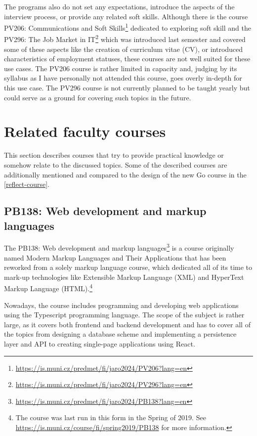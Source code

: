 \documentclass[
  digital,
  color,
  oneside,
  nosansbold,
  nocolorbold,
  nolof,
  nolot,
]{fithesis4}
\begin{document}
The programs also do not set any expectations, introduce the aspects of the interview process, or provide any related soft skills. Although there is the course PV206: Communications and Soft Skills\footnote{\url{https://is.muni.cz/predmet/fi/jaro2024/PV206?lang=en}} dedicated to exploring soft skill and the PV296: The Job Market in IT\footnote{\url{https://is.muni.cz/predmet/fi/jaro2024/PV296?lang=en}} which was introduced last semester and covered some of these aspects like the creation of curriculum vitae (CV), or introduced characteristics of employment statuses, these courses are not well suited for these use cases. The PV206 course is rather limited in capacity and, judging by its syllabus as I have personally not attended this course, goes overly in-depth for this use case. The PV296 course is not currently planned to be taught yearly but could serve as a ground for covering such topics in the future.

\section{Related faculty courses}

This section describes courses that try to provide practical knowledge or somehow relate to the discussed topics. Some of the described courses are additionally mentioned and compared to the design of the new Go course in the \cref{reflect-course}.

\subsection{PB138: Web development and markup languages}\label{web-dev}

The PB138: Web development and markup languages\footnote{\url{https://is.muni.cz/predmet/fi/jaro2024/PB138?lang=en}}
is a course originally named Modern Markup Languages and Their Applications that has been reworked from a solely markup language course, which dedicated all of its time to mark-up technologies like Extensible Markup Language (XML) and HyperText Markup Language (HTML).\footnote{The course was last run in this form in the Spring of 2019. See \url{https://is.muni.cz/course/fi/spring2019/PB138} for more information.}

Nowadays, the course includes programming and developing web applications using the Typescript programming language\cite{typescript}. The scope of the subject is rather large, as it covers both frontend and backend development and has to cover all of the topics from designing a database scheme and implementing a persistence layer and API to creating single-page applications using React\cite{react}.
\end{document}
